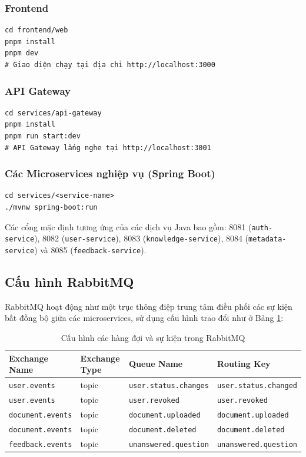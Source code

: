 \documentclass[12pt,a4paper]{report}
\begin{document}
\subsubsection{Frontend}
\begin{verbatim}
cd frontend/web
pnpm install
pnpm dev
# Giao diện chạy tại địa chỉ http://localhost:3000
\end{verbatim}

\subsubsection{API Gateway}
\begin{verbatim}
cd services/api-gateway
pnpm install
pnpm run start:dev
# API Gateway lắng nghe tại http://localhost:3001
\end{verbatim}

\subsubsection{Các Microservices nghiệp vụ (Spring Boot)}
\begin{verbatim}
cd services/<service-name>
./mvnw spring-boot:run
\end{verbatim}
Các cổng mặc định tương ứng của các dịch vụ Java bao gồm: 8081 (\texttt{auth-service}), 8082 (\texttt{user-service}), 8083 (\texttt{knowledge-service}), 8084 (\texttt{metadata-service}) và 8085 (\texttt{feedback-service}).

\subsection{Cấu hình RabbitMQ}
RabbitMQ hoạt động như một trục thông điệp trung tâm điều phối các sự kiện bất đồng bộ giữa các microservices, sử dụng cấu hình trao đổi như ở Bảng \ref{tab:rabbitmq_exchanges}:
\begin{table}[H]
\centering
\caption{Cấu hình các hàng đợi và sự kiện trong RabbitMQ}
\label{tab:rabbitmq_exchanges}
\begin{tabularx}{\textwidth}{|l|l|l|l|}
\hline
\rowcolor{gray!10}
Exchange Name & Exchange Type & Queue Name & Routing Key \\ \hline
\texttt{user.events} & topic & \texttt{user.status.changes} & \texttt{user.status.changed} \\ \hline
\texttt{user.events} & topic & \texttt{user.revoked} & \texttt{user.revoked} \\ \hline
\texttt{document.events} & topic & \texttt{document.uploaded} & \texttt{document.uploaded} \\ \hline
\texttt{document.events} & topic & \texttt{document.deleted} & \texttt{document.deleted} \\ \hline
\texttt{feedback.events} & topic & \texttt{unanswered.question} & \texttt{unanswered.question} \\ \hline
\end{tabularx}
\end{table}
\end{document}

